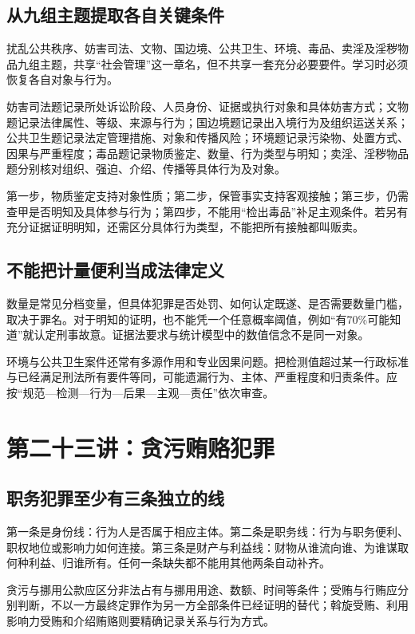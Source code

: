 \subsection{从九组主题提取各自关键条件}
扰乱公共秩序、妨害司法、文物、国边境、公共卫生、环境、毒品、卖淫及淫秽物品九组主题，共享“社会管理”这一章名，但不共享一套充分必要要件。学习时必须恢复各自对象与行为。

妨害司法题记录所处诉讼阶段、人员身份、证据或执行对象和具体妨害方式；文物题记录法律属性、等级、来源与行为；国边境题记录出入境行为及组织运送关系；公共卫生题记录法定管理措施、对象和传播风险；环境题记录污染物、处置方式、因果与严重程度；毒品题记录物质鉴定、数量、行为类型与明知；卖淫、淫秽物品题分别核对组织、强迫、介绍、传播等具体行为及对象。

第一步，物质鉴定支持对象性质；第二步，保管事实支持客观接触；第三步，仍需查甲是否明知及具体参与行为；第四步，不能用“检出毒品”补足主观条件。若另有充分证据证明明知，还需区分具体行为类型，不能把所有接触都叫贩卖。

\subsection{不能把计量便利当成法律定义}
数量是常见分档变量，但具体犯罪是否处罚、如何认定既遂、是否需要数量门槛，取决于罪名。对于明知的证明，也不能凭一个任意概率阈值，例如“有70\%可能知道”就认定刑事故意。证据法要求与统计模型中的数值信念不是同一对象。

环境与公共卫生案件还常有多源作用和专业因果问题。把检测值超过某一行政标准与已经满足刑法所有要件等同，可能遗漏行为、主体、严重程度和归责条件。应按“规范—检测—行为—后果—主观—责任”依次审查。


\section{第二十三讲：贪污贿赂犯罪}
\subsection{职务犯罪至少有三条独立的线}
第一条是身份线：行为人是否属于相应主体。第二条是职务线：行为与职务便利、职权地位或影响力如何连接。第三条是财产与利益线：财物从谁流向谁、为谁谋取何种利益、归谁所有。任何一条缺失都不能用其他两条自动补齐。

贪污与挪用公款应区分非法占有与挪用用途、数额、时间等条件；受贿与行贿应分别判断，不以一方最终定罪作为另一方全部条件已经证明的替代；斡旋受贿、利用影响力受贿和介绍贿赂则要精确记录关系与行为方式。

